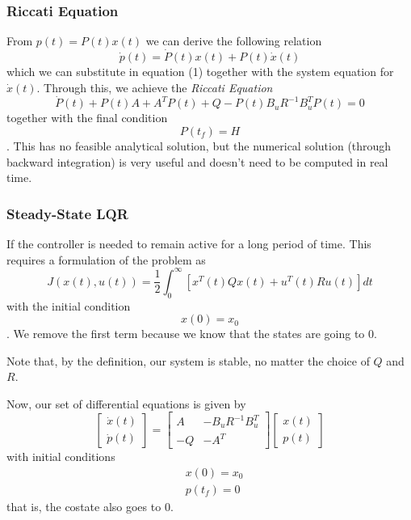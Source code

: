 \subsubsection*{Riccati Equation}

From $p(t)=P(t)x(t)$ we can derive the following relation \[
    \dot{p}(t)=\dot{P}(t)x(t) + P(t)\dot{x}(t)
\] which we can substitute in equation (1) together with the system equation for $\dot{x}(t)$. Through this, we achieve the \emph{Riccati Equation} \[
\dot{P}(t) + P(t)A + A^TP(t) + Q - P(t)B_uR^{-1}B_u^{T}P(t) = 0
\] together with the final condition \[
P(t_f) = H
\] . This has no feasible analytical solution, but the numerical solution (through backward integration) is very useful and doesn't need to be computed in real time.

\subsubsection*{Steady-State LQR}

If the controller is needed to remain active for a long period of time. This requires a formulation of the problem as \[
J(x(t), u(t)) = \frac{1}{2}\int_{0}^{\infty}\left[ x^{T}(t)Qx(t) + u^T(t)Ru(t) \right] dt
\] with the initial condition \[
x(0) = x_0
\] . We remove the first term because we know that the states are going to $0$.

Note that, by the definition, our system is stable, no matter the choice of $Q$ and $R$.

Now, our set of differential equations is given by
\begin{equation}
    \begin{bmatrix} \dot{x}(t) \\ \dot{p}(t) \end{bmatrix} = \begin{bmatrix} A & -B_uR^{-1}B^{T}_u \\ -Q & -A^T \end{bmatrix} \begin{bmatrix} x(t) \\ p(t) \end{bmatrix} 
\end{equation}
with initial conditions
\begin{equation*}
    \begin{split}
	& x(0) = x_0 \\
	& p(t_f) = 0
    \end{split}
\end{equation*}
that is, the costate also goes to $0$.

